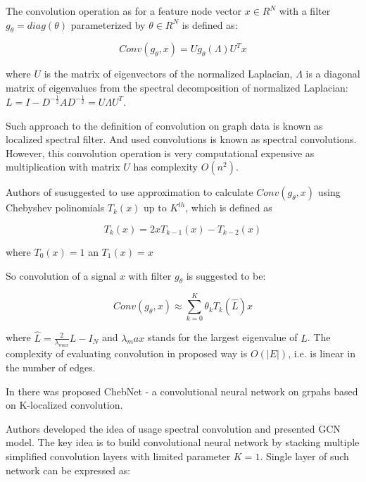 The convolution operation  as for a feature node vector $x \in R^N$ with a
filter $g_\theta = diag(\theta)$ parameterized by $\theta \in R^N$ is defined as:


\begin{equation}
    Conv(g_\theta,x) = Ug_\theta(\Lambda)U^{T}x
    \label{eq:simple_conv}
 \end{equation}


where $U$ is the matrix of eigenvectors of the normalized Laplacian, $\Lambda$ is a diagonal matrix of 
eigenvalues from the spectral decomposition of normalized Laplacian: $L = I - D^{-\frac{1}{2}}AD^{-\frac{1}{2}} = U\Lambda U^{T}$.

Such approach to the definition of convolution on graph data is known as localized spectral filter. And used convolutions is known as 
spectral convolutions.
However, this convolution operation is very computational expensive as multiplication with matrix $U$ has complexity $O(n^2)$.


Authors of \cite{ChebAppr} susuggested to use approximation to calculate 
$Conv(g_\theta,x)$ using Chebyshev polinomials $T_k(x)$ up to $K^{th}$, which is defined as 

\begin{equation}
    T_k (x) = 2xT_{k-1}(x) - T_{k-2}(x)
    \label{eq:cheb_polynom}
 \end{equation}


where $T_0(x)=1$ an $T_1(x)=x$

So convolution of a signal $x$ with filter $g_\theta$ is suggested to be:

\begin{equation}
    Conv(g_\theta,x) \approx \sum_{k=0}^{K}{\theta}_k T_k(\hat{L})x
    \label{eq:conv_appr}
 \end{equation}

where $\hat{L} = \frac{2}{\lambda_{max}}L-I_N$ and $\lambda_max$ 
stands for the largest eigenvalue of $L$.
The complexity of evaluating convolution in proposed way is $O(|E|)$, i.e. is linear in the number of edges.

In \cite{ChebNet} there was proposed ChebNet - a convolutional neural network on grpahs based on K-localized convolution.

Authors \cite{GCN} developed the idea of usage spectral convolution and presented GCN model. The key idea is to build
convolutional neural network by stacking multiple simplified convolution layers with limited parameter $K=1$.
Single layer of such network can be expressed as: 


